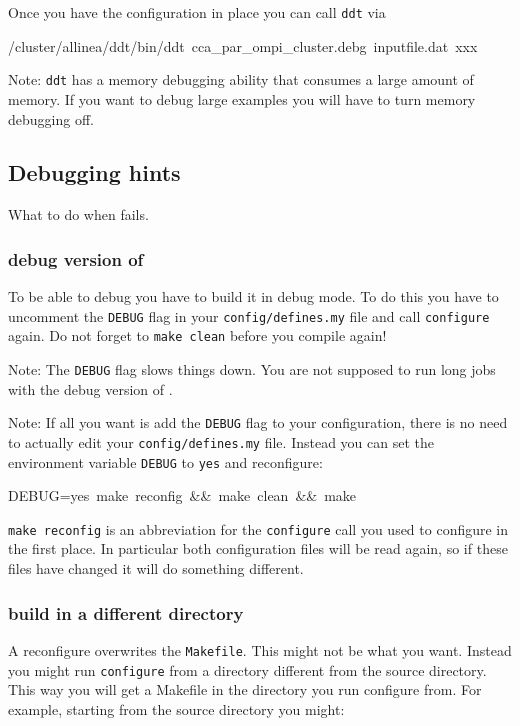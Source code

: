 Once you have the configuration in place you can call \texttt{ddt}
via

\begin{lyxcode}
/cluster/allinea/ddt/bin/ddt~cca\_par\_ompi\_cluster.debg~inputfile.dat~xxx
\end{lyxcode}
Note: \texttt{ddt} has a memory debugging ability that consumes a
large amount of memory. If you want to debug large examples you will
have to turn memory debugging off.


\subsection{Debugging hints}

What to do when \ccarat{} fails.


\subsubsection{debug version of \ccarat{}}

To be able to debug \ccarat{} you have to build it in debug mode.
To do this you have to uncomment the \texttt{DEBUG} flag in your \texttt{config/defines.my}
file and call \texttt{configure} again. Do not forget to \texttt{make
clean} before you compile again!

Note: The \texttt{DEBUG} flag slows things down. You are not supposed
to run long jobs with the debug version of \ccarat{}.

Note: If all you want is add the \texttt{DEBUG} flag to your configuration,
there is no need to actually edit your \texttt{config/defines.my}
file. Instead you can set the environment variable \texttt{DEBUG}
to \texttt{yes} and reconfigure:

\begin{lyxcode}
DEBUG=yes~make~reconfig~\&\&~make~clean~\&\&~make
\end{lyxcode}
\texttt{make reconfig} is an abbreviation for the \texttt{configure}
call you used to configure in the first place. In particular both
configuration files will be read again, so if these files have changed
it will do something different.


\subsubsection{build in a different directory}

A \ccarat{} reconfigure overwrites the \texttt{Makefile}. This might
not be what you want. Instead you might run \texttt{configure} from
a directory different from the \ccarat{} source directory. This way
you will get a Makefile in the directory you run configure from. For
example, starting from the \ccarat{} source directory you might:

